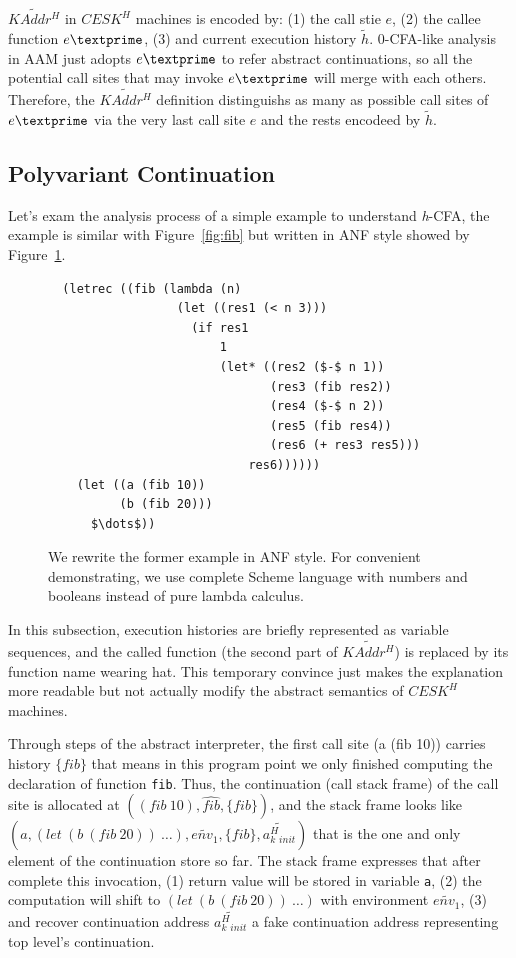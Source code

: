 \documentclass{article}
\begin{document}
$\widetilde{KAddr^H}$ in $CESK^H$ machines is encoded by: (1) the call stie $e$, (2) the callee function $e\textprime$, (3) and current execution history $\tilde{h}$. 0-CFA-like analysis in AAM just adopts $e\textprime$ to refer abstract continuations, so all the potential call sites that may invoke $e\textprime$ will merge with each others. Therefore, the $\widetilde{KAddr^H}$ definition distinguishs as many as possible call sites of $e\textprime$ via the very last call site $e$ and the rests encodeed by $\tilde{h}$.

\subsection{Polyvariant Continuation}
\label{sub:Polyvariant Continuation}
Let's exam the analysis process of a simple example to understand \textit{h}-CFA, the example is similar with Figure~\ref{fig:fib} but written in ANF style showed by Figure~\ref{fig:anf-fib}.

\begin{figure}
\small
{}
\begin{lstlisting}
  (letrec ((fib (lambda (n)
                  (let ((res1 (< n 3)))
                    (if res1
                        1
                        (let* ((res2 ($-$ n 1))
                               (res3 (fib res2))
                               (res4 ($-$ n 2))
                               (res5 (fib res4))
                               (res6 (+ res3 res5)))
                            res6))))))
    (let ((a (fib 10))
          (b (fib 20)))
      $\dots$))
\end{lstlisting}
\caption{
We rewrite the former example in ANF style.
For convenient  demonstrating, we use complete Scheme language with numbers and booleans instead of pure lambda calculus.
}
\label{fig:anf-fib}
\end{figure}

In this subsection, execution histories are briefly represented as variable sequences, and the called function (the second part of $\widetilde{KAddr^H}$) is replaced by its function name wearing hat. This temporary convince just makes the explanation more readable but not actually modify the abstract semantics of $CESK^H$ machines.

Through steps of the abstract interpreter, the first call site (a (fib 10)) carries history $\{fib\}$ that means in this program point we only finished computing the declaration of function \verb|fib|.
Thus, the continuation (call stack frame) of the call site is allocated at $((fib\ 10), \widehat{fib}, \{fib\})$, and the stack frame looks like $(a, (let\ (b\ (fib\ 20))\ \dots), \widetilde{env_1}, \{fib\}, \widetilde{a^H_k{}_{init}})$ that is the one and only element of the continuation store so far.
The stack frame expresses that after complete this invocation,
(1) return value will be stored in variable \verb|a|,
(2) the computation will shift to $(let\ (b\ (fib\ 20))\ \dots)$ with environment $\widetilde{env_1}$,
(3) and recover continuation address $\widetilde{a^H_k{}_{init}}$ a fake continuation address representing top level's continuation.
\end{document}
